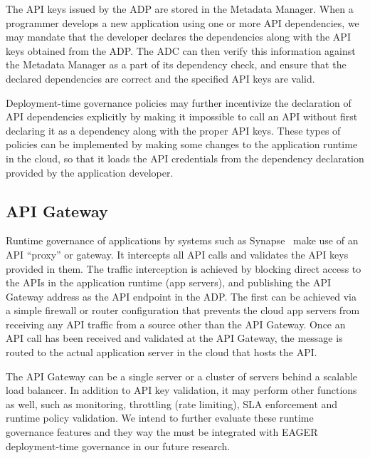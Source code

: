 The API keys issued by the ADP are stored in the Metadata Manager. When a
programmer develops a new application using one or more API dependencies, we
may mandate that the developer declares the dependencies along with the API
keys obtained from the ADP. The ADC can then verify this information against
the Metadata Manager as a part of its dependency check, and ensure that the
declared dependencies are correct and the specified API keys are valid. 

Deployment-time governance policies
may further incentivize the declaration of API 
dependencies explicitly by making it 
impossible to call an API without first declaring it as a dependency along
with the proper API keys. These types of policies can be implemented
by making some changes to the
application runtime in the cloud, so that it loads the API credentials from
the dependency declaration provided by the application developer.

\subsection{API Gateway} 
Runtime governance of applications by systems such as
Synapse~\cite{synapse} make use of an API ``proxy'' or gateway.
It
intercepts all API calls and validates the API keys provided in them. The
traffic interception is achieved by blocking direct access to the APIs in the
application runtime (app servers), and publishing the API Gateway address as
the API endpoint in the ADP. The first can be achieved via a simple firewall
or router configuration that prevents the cloud app servers from receiving any
API traffic from a source other than the API Gateway. Once an API call has
been received and validated at the API Gateway, the message is routed to the
actual application server in the cloud that hosts the API.

The API Gateway can be a single server or a cluster of servers 
behind a scalable load balancer. %
In addition to API key validation, it may perform other
functions as well, such as monitoring, throttling (rate limiting), SLA
enforcement and runtime policy validation. We intend to further evaluate these
runtime governance features and they way the must be integrated with
EAGER deployment-time governance
in our future research.
